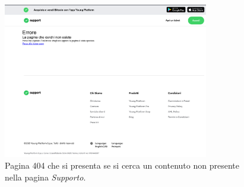 \begin{figure}[H]
  \centering
  \includegraphics[width=0.80\textwidth]{res/images/404-support.png}
  \caption{Pagina 404 che si presenta se si cerca un contenuto non presente 
  nella pagina \textit{Supporto}.}
  \label{fig:404-support}
\end{figure}
